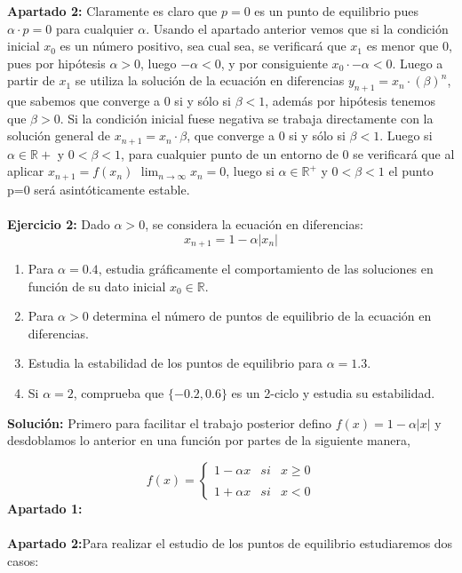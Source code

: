\documentclass{article}
\begin{document}
\textbf{Apartado 2:} Claramente es claro que $p=0$ es un punto de equilibrio pues $\alpha \cdot p = 0$ para cualquier $\alpha$.
Usando el apartado anterior vemos que si la condición inicial $x_0$ es un número positivo, sea cual sea, se verificará que $x_1$ es menor que 0, pues por hipótesis $\alpha > 0$, luego $-\alpha < 0$, y por consiguiente $x_0 \cdot -\alpha < 0$. Luego a partir de $x_1$ se utiliza la solución de la ecuación en diferencias $y_{n+1}=x_n \cdot (\beta)^n$, que sabemos que converge a 0 si y sólo si $\beta < 1$, además por hipótesis tenemos que $\beta > 0$. Si la condición inicial fuese negativa se trabaja directamente con la solución general de $x_{n+1}=x_n \cdot \beta$, que converge a 0 si y sólo si $\beta < 1$. Luego si $\alpha \in \mathbb{R}+$ y $0 < \beta < 1$, para cualquier punto de un entorno de 0 se verificará que al aplicar $x_{n+1} = f(x_n)$ $\lim_{n \to \infty} x_n = 0$, luego si $\alpha \in \mathbb{R}^+$ y $0 < \beta < 1$ el punto p=0 será asintóticamente estable. \\ \\

\textbf{Ejercicio 2:} Dado $\alpha > 0$, se considera la ecuación en diferencias:
\begin{equation*}
x_{n+1} = 1 - \alpha|x_n|
\end{equation*}

\begin{enumerate}
\item Para $\alpha = 0.4$, estudia gráficamente el comportamiento de las soluciones en función de su dato inicial $x_0 \in \mathbb{R}$.
\item Para $\alpha > 0$ determina el número de puntos de equilibrio de la ecuación en diferencias.
\item Estudia la estabilidad de los puntos de equilibrio para $\alpha = 1.3$.
\item Si $\alpha = 2$, comprueba que $\{-0.2,0.6\}$ es un 2-ciclo y estudia su estabilidad.
\end{enumerate}

\textbf{Solución:} Primero para facilitar el trabajo posterior defino $f(x) = 1 - \alpha|x|$ y desdoblamos lo anterior en una función por partes de la siguiente manera,

\begin{equation*}
f(x)= \left\{ \begin{array}{lcc}
             1 -\alpha x &   si  & x \geq 0 \\
             \\ 1 + \alpha x &  si & x < 0
             \end{array}
   \right.
\end{equation*}
\textbf{Apartado 1:} \\ \\
\textbf{Apartado 2:}Para realizar el estudio de los puntos de equilibrio estudiaremos dos casos:
\end{document}
